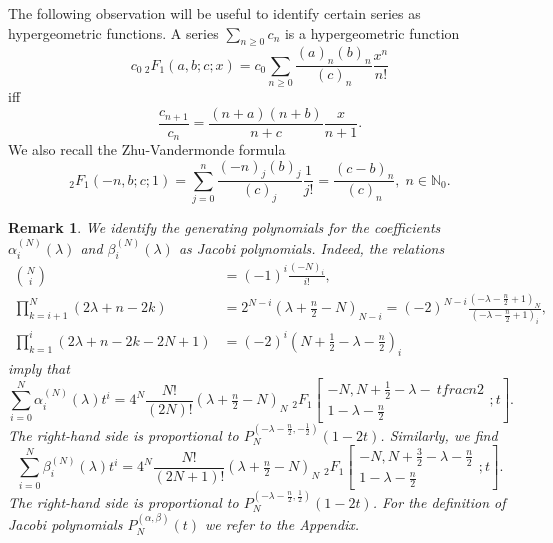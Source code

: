 \documentclass[a4paper,12pt,reqno]{amsart}
\newtheorem{bem}[theorem]{Remark}
\numberwithin{theorem}{subsection}
\numberwithin{equation}{section}
\begin{document}
The following observation will be useful to identify certain series as
hypergeometric functions. A series $\sum_{n \ge 0} c_n$ is a hypergeometric
function
$$
   c_0 \, {}_2F_1(a,b;c;x) = c_0  \sum_{n \ge 0} \frac{(a)_n (b)_n}{(c)_n} \frac{x^n}{n!}
$$
iff
$$
   \frac{c_{n+1}}{c_n} = \frac{(n+a)(n+b)}{n+c} \frac{x}{n+1}.
$$
We also recall the Zhu-Vandermonde formula
\begin{equation}\label{ZV}
   {}_2F_1(-n,b;c;1) = \sum_{j = 0}^n \frac{(-n)_j (b)_j}{(c)_j} \frac{1}{j!} =
   \frac{(c-b)_n}{(c)_n}, \; n \in {\mathbb{N}}_0.
\end{equation}

\begin{bem}\label{coeff-Jacobi} We identify the generating polynomials for the coefficients
$\alpha_i^{(N)}(\lambda)$ and $\beta_i^{(N)}(\lambda)$ as Jacobi polynomials.
Indeed, the relations
\begin{align*}
   \binom{N}{i} & =(-1)^{i} \frac{(-N)_i}{i!},\\
   \prod_{k=i+1}^N (2\lambda\!+\!n\!-\!2k) & = 2^{N-i}(\lambda\!+\!\tfrac n2\!-\!N)_{N-i}
   = (-2)^{N-i} \frac{(-\lambda\!-\!\tfrac n2\!+\!1)_N}{(-\lambda\!-\!\tfrac n2\!+\!1)_i}, \\
   \prod_{k=1}^i (2\lambda\!+\!n\!-\!2k\!-\!2N\!+\!1) & =(-2)^i (N\!+\!\tfrac 12\!-\!\lambda\!-\!\tfrac n2)_i
\end{align*}
imply that
\begin{equation*}
   \sum_{i=0}^N \alpha_i^{(N)}(\lambda) t^i = 4^N  \frac{N!}{(2N)!} (\lambda \!+\! \tfrac
   n2\! - \!N)_N \; {}_2F_1\left[\begin{matrix} -N, N\!+\!\tfrac 12\!-\!\lambda \!-\!\ tfrac n2 \\
   1\!-\!\lambda\!-\!\tfrac n2 \end{matrix};t\right].
\end{equation*}
The right-hand side is proportional to
$P_N^{(-\lambda-\frac{n}{2},-\frac{1}{2})}(1\!-\!2t)$. Similarly, we find
\begin{equation*}
   \sum_{i=0}^N \beta_i^{(N)}(\lambda) t^i = 4^N  \frac{N!}{(2N\!+\!1)!} (\lambda\!+\!\tfrac
   n2\!-\!N)_N \; {}_2F_1\left[\begin{matrix} -N,  N\!+\!\tfrac 32\!-\!\lambda\!-\!\tfrac n2 \\
   1\!-\!\lambda\!-\!\tfrac n2 \end{matrix};t\right].
\end{equation*}
The right-hand side is proportional to
$P_N^{(-\lambda-\frac{n}{2},\frac{1}{2})}(1\!-\!2t)$. For the definition of
Jacobi polynomials $P_N^{(\alpha,\beta)}(t)$ we refer to the Appendix.
\end{bem}
\end{document}
